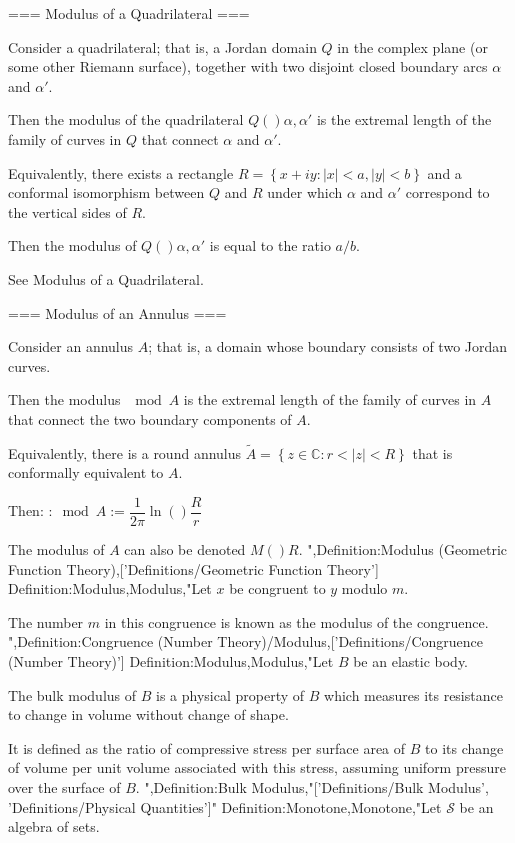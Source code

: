=== Modulus of a Quadrilateral ===

Consider a quadrilateral; that is, a Jordan domain $Q$ in the complex plane (or some other Riemann surface), together with two disjoint closed boundary arcs $\alpha$ and $\alpha'$.

Then the modulus of the quadrilateral $Q \left(   \right){\alpha, \alpha'}$ is the extremal length of the family of curves in $Q$ that connect $\alpha$ and $\alpha'$.

Equivalently, there exists a rectangle $R = \left\lbrace x + i y: \left\lvert x \right\rvert < a, \left\lvert y \right\rvert < b \right\rbrace$ and a conformal isomorphism between $Q$ and $R$ under which $\alpha$ and $\alpha'$ correspond to the vertical sides of $R$.

Then the modulus of $Q \left(   \right){\alpha, \alpha'}$ is equal to the ratio $a/b$.


See Modulus of a Quadrilateral.


=== Modulus of an Annulus ===

Consider an annulus $A$; that is, a domain whose boundary consists of two Jordan curves.

Then the modulus $\mod A$ is the extremal length of the family of curves in $A$ that connect the two boundary components of $A$.

Equivalently, there is a round annulus $\tilde A = \left\lbrace z \in \mathbb C: r < \left\lvert z \right\rvert < R \right\rbrace$ that is conformally equivalent to $A$.

Then:
:$\mod A := \dfrac 1 {2 \pi} \ln \left(   \right){\dfrac R r}$

The modulus of $A$ can also be denoted $M \left(   \right)R$.
",Definition:Modulus (Geometric Function Theory),['Definitions/Geometric Function Theory']
Definition:Modulus,Modulus,"Let $x$ be congruent to $y$ modulo $m$.

The number $m$ in this congruence is known as the modulus of the congruence.
",Definition:Congruence (Number Theory)/Modulus,['Definitions/Congruence (Number Theory)']
Definition:Modulus,Modulus,"Let $B$ be an elastic body.

The bulk modulus of $B$ is a physical property of $B$ which measures its resistance to change in volume without change of shape.

It is defined as the ratio of compressive stress per surface area of $B$ to its change of volume per unit volume associated with this stress, assuming uniform pressure over the surface of $B$.
",Definition:Bulk Modulus,"['Definitions/Bulk Modulus', 'Definitions/Physical Quantities']"
Definition:Monotone,Monotone,"Let $\mathcal S$ be an algebra of sets.

